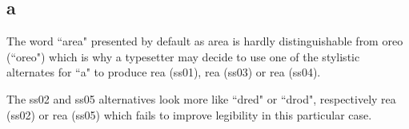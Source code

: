 \subsection{a}

The word ``area" presented by default as {\ssdefault area} is hardly
distinguishable from {\ssdefault oreo} (``oreo") which is why a typesetter may
decide to use one of the stylistic alternates for ``a" to produce
{re{\ssone a}} (ss01),
{re{\ssthree a}} (ss03) or
{re{\ssfour a}} (ss04).

The ss02 and ss05 alternatives look more like ``dred" or ``drod", respectively
{re{\sstwo a}} (ss02) or
{re{\ssfive a}} (ss05)
which fails to improve legibility in this particular case.


